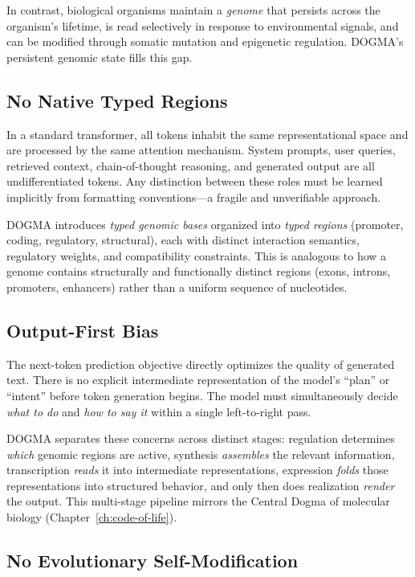 In contrast, biological organisms maintain a \emph{genome} that persists across the organism's lifetime, is read selectively in response to environmental signals, and can be modified through somatic mutation and epigenetic regulation. DOGMA's persistent genomic state fills this gap.

\subsection{No Native Typed Regions}

In a standard transformer, all tokens inhabit the same representational space and are processed by the same attention mechanism. System prompts, user queries, retrieved context, chain-of-thought reasoning, and generated output are all undifferentiated tokens. Any distinction between these roles must be learned implicitly from formatting conventions---a fragile and unverifiable approach.

DOGMA introduces \emph{typed genomic bases} organized into \emph{typed regions} (promoter, coding, regulatory, structural), each with distinct interaction semantics, regulatory weights, and compatibility constraints. This is analogous to how a genome contains structurally and functionally distinct regions (exons, introns, promoters, enhancers) rather than a uniform sequence of nucleotides.

\subsection{Output-First Bias}

The next-token prediction objective directly optimizes the quality of generated text. There is no explicit intermediate representation of the model's ``plan'' or ``intent'' before token generation begins. The model must simultaneously decide \emph{what to do} and \emph{how to say it} within a single left-to-right pass.

DOGMA separates these concerns across distinct stages: regulation determines \emph{which} genomic regions are active, synthesis \emph{assembles} the relevant information, transcription \emph{reads} it into intermediate representations, expression \emph{folds} those representations into structured behavior, and only then does realization \emph{render} the output. This multi-stage pipeline mirrors the Central Dogma of molecular biology (Chapter~\ref{ch:code-of-life}).

\subsection{No Evolutionary Self-Modification}

